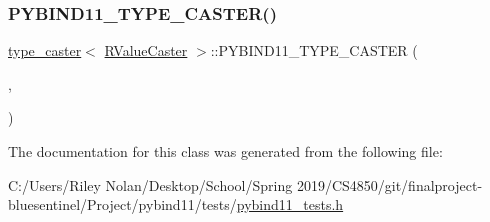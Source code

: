 \mbox{\label{classtype__caster_3_01_r_value_caster_01_4_a4c1ab8ffd92e6fcda655f0b955edecd0}} 
\subsubsection{\texorpdfstring{PYBIND11\_TYPE\_CASTER()}{PYBIND11\_TYPE\_CASTER()}}
{\footnotesize\ttfamily \mbox{\hyperlink{classtype__caster}{type\+\_\+caster}}$<$ \mbox{\hyperlink{struct_r_value_caster}{R\+Value\+Caster}} $>$\+::P\+Y\+B\+I\+N\+D11\+\_\+\+T\+Y\+P\+E\+\_\+\+C\+A\+S\+T\+ER (\begin{DoxyParamCaption}\item[{\mbox{\hyperlink{struct_r_value_caster}{R\+Value\+Caster}}}]{,  }\item[{\mbox{\hyperlink{descr_8h_af114703e20c6527e87163eb2798f74b8}{\+\_\+}}(\char`\"{}R\+Value\+Caster\char`\"{})}]{ }\end{DoxyParamCaption})}



The documentation for this class was generated from the following file\+:\begin{DoxyCompactItemize}
\item 
C\+:/\+Users/\+Riley Nolan/\+Desktop/\+School/\+Spring 2019/\+C\+S4850/git/finalproject-\/bluesentinel/\+Project/pybind11/tests/\mbox{\hyperlink{pybind11__tests_8h}{pybind11\+\_\+tests.\+h}}\end{DoxyCompactItemize}
